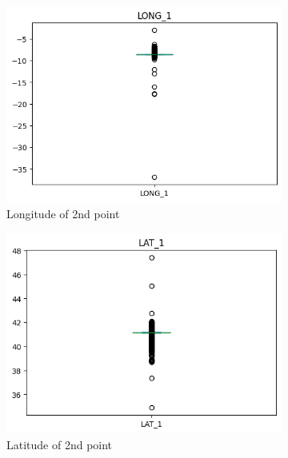 \documentclass[12pt, titlepage]{article}
\begin{document}
\begin{figure}[H]
\begin{subfigure}[t]{.49\textwidth}
        \includegraphics[width =\textwidth]{image/long1_train.png}
        \caption{Longitude of 2nd point}
        \label{fig:long_lat}
    \end{subfigure}
    \hfill
    \begin{subfigure}[t]{.49\textwidth}
        \includegraphics[width =\textwidth]{image/lat1_train.png}
        \caption{Latitude of 2nd point}
        \label{fig:long_lat}
    \end{subfigure}
    \hfill
    \begin{subfigure}[t]{.49\textwidth}

\end{subfigure}
\end{figure}
\end{document}
